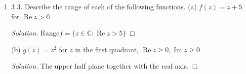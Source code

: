 \begin{enumerate}
(d) $q(z)=\frac{2 z^2+3}{|z-1|}$
\begin{proof}[Solution]
	\begin{align*}
		q(z)&= q(x,y) \\
		&= \frac{2(x+iy)^2+3}{\sqrt{(x-1)^2+y^2} } \\
		&= \frac{2 x^2+4 i x y-2 y^2+3}{\sqrt{x^2-2 x+y^2+1}} \\
		&= \frac{2 x^2-2 y^2+3}{\sqrt{x^2-2 x+y^2+1}}
		+ i\frac{4 x y}{\sqrt{x^2-2 x+y^2+1}} 
	.\end{align*}
\end{proof}

(e) $F(z)=e^{3 z}$
\begin{proof}[Solution]
	\begin{align*}
		F(z) &= F(x,y) \\
		&= e^{3(x+iy)} \\
		&= e^{3x} e^{3iy} \\
		&= e^{3x} \left( \cos 3y + i \sin 3y \right)  \\
		&= e^{3x}  \cos 3y + i e^{3x}\sin 3y  
	.\end{align*}
\end{proof}

(f) $G(z)=e^z+e^{-z}$
\begin{proof}[Solution]
	\begin{align*}
		G(z) &= G(x,y) \\
		&= e^{x+iy } + e^{-x-iy} \\
		&= e^{x}\left( \cos y + i \sin y \right)+ e^{-x}\left( \cos -y + i \sin -y \right)  \\
		&= e^{x}\left( \cos y + i \sin y \right)+ e^{-x}\left( \cos y - i \sin y \right)  \\
		&= \left( e^x+e^{-x} \right) \cos y + i \left( e^{x} - e^{-x}  \right) \sin y
	.\end{align*}
\end{proof}

\item 3 3. Describe the range of each of the following functions.
(a) $f(z)=z+5$ for $\operatorname{Re} z>0$
\begin{proof}[Solution]
	$\text{Range} f = \{z \in \mathbb{C}: \operatorname{Re} z > 5\} $
\end{proof}

(b) $g(z)=z^2$ for $z$ in the first quadrant, $\operatorname{Re} z \geq 0, \operatorname{Im} z \geq 0$
\begin{proof}[Solution]
	The upper half plane together with the real axis.
\end{proof}


\end{enumerate}
